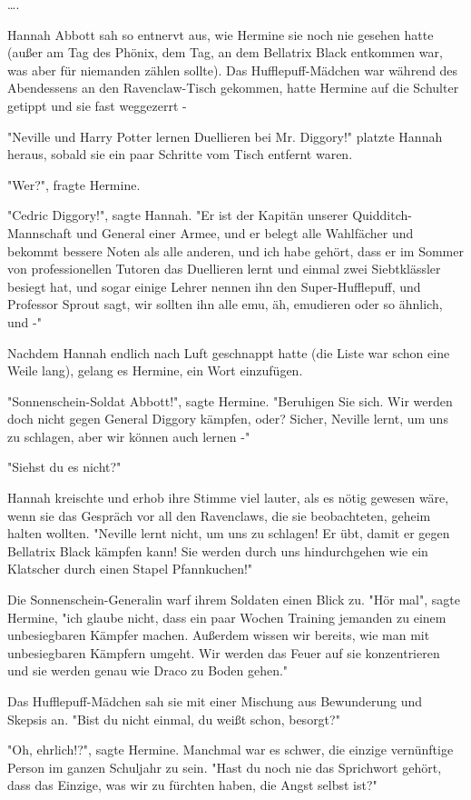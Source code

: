 {….

Hannah Abbott sah so entnervt aus, wie Hermine sie noch nie gesehen hatte (außer am Tag des Phönix, dem Tag, an dem Bellatrix Black entkommen war, was aber für niemanden zählen sollte). Das Hufflepuff-Mädchen war während des Abendessens an den Ravenclaw-Tisch gekommen, hatte Hermine auf die Schulter getippt und sie fast weggezerrt -

"Neville und Harry Potter lernen Duellieren bei Mr. Diggory!" platzte Hannah heraus, sobald sie ein paar Schritte vom Tisch entfernt waren.

"Wer?", fragte Hermine.

"Cedric Diggory!", sagte Hannah. "Er ist der Kapitän unserer Quidditch-Mannschaft und General einer Armee, und er belegt alle Wahlfächer und bekommt bessere Noten als alle anderen, und ich habe gehört, dass er im Sommer von professionellen Tutoren das Duellieren lernt und einmal zwei Siebtklässler besiegt hat, und sogar einige Lehrer nennen ihn den Super-Hufflepuff, und Professor Sprout sagt, wir sollten ihn alle emu, äh, emudieren oder so ähnlich, und -"

Nachdem Hannah endlich nach Luft geschnappt hatte (die Liste war schon eine Weile lang), gelang es Hermine, ein Wort einzufügen.

"Sonnenschein-Soldat Abbott!", sagte Hermine. "Beruhigen Sie sich. Wir werden doch nicht gegen General Diggory kämpfen, oder? Sicher, Neville lernt, um uns zu schlagen, aber wir können auch lernen -"

"Siehst du es nicht?"

Hannah kreischte und erhob ihre Stimme viel lauter, als es nötig gewesen wäre, wenn sie das Gespräch vor all den Ravenclaws, die sie beobachteten, geheim halten wollten. "Neville lernt nicht, um uns zu schlagen! Er übt, damit er gegen Bellatrix Black kämpfen kann! Sie werden durch uns hindurchgehen wie ein Klatscher durch einen Stapel Pfannkuchen!"

Die Sonnenschein-Generalin warf ihrem Soldaten einen Blick zu. "Hör mal", sagte Hermine, "ich glaube nicht, dass ein paar Wochen Training jemanden zu einem unbesiegbaren Kämpfer machen. Außerdem wissen wir bereits, wie man mit unbesiegbaren Kämpfern umgeht. Wir werden das Feuer auf sie konzentrieren und sie werden genau wie Draco zu Boden gehen."

Das Hufflepuff-Mädchen sah sie mit einer Mischung aus Bewunderung und Skepsis an. "Bist du nicht einmal, du weißt schon, besorgt?"

"Oh, ehrlich!?", sagte Hermine. Manchmal war es schwer, die einzige vernünftige Person im ganzen Schuljahr zu sein. "Hast du noch nie das Sprichwort gehört, dass das Einzige, was wir zu fürchten haben, die Angst selbst ist?"

}
